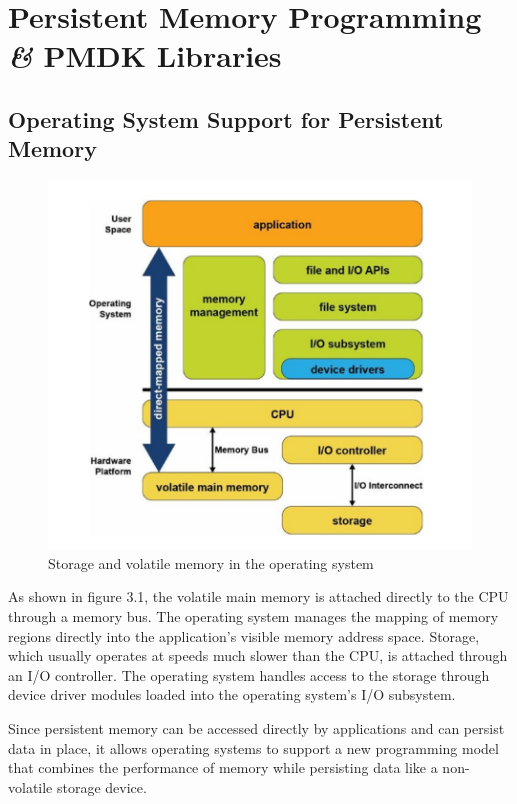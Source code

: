 \documentclass[11pt,swedish, openany, oneside]{book}
\begin{document}
\chapter{Persistent Memory Programming \textit{\&} PMDK Libraries}

\section{Operating System Support for Persistent Memory}
\begin{figure}[H]
   \centering
   \includegraphics[width=0.6\linewidth]{oss1.png}
   \caption{Storage and volatile memory in the operating system\cite{Scargall2020}}
\end{figure}
As shown in figure 3.1, the volatile main memory is attached directly to the CPU through a memory bus. The operating system manages the mapping of memory regions directly into the application’s visible memory address space. Storage, which usually operates at speeds much slower than the CPU, is attached through an I/O controller. The operating system handles access to the storage through device driver modules loaded into the operating system's I/O subsystem.

Since persistent memory can be accessed directly by applications and can persist data in place, it allows operating systems to support a new programming model that combines the performance of memory while persisting data like a non-volatile storage device.\cite{Scargall2020}
\end{document}
